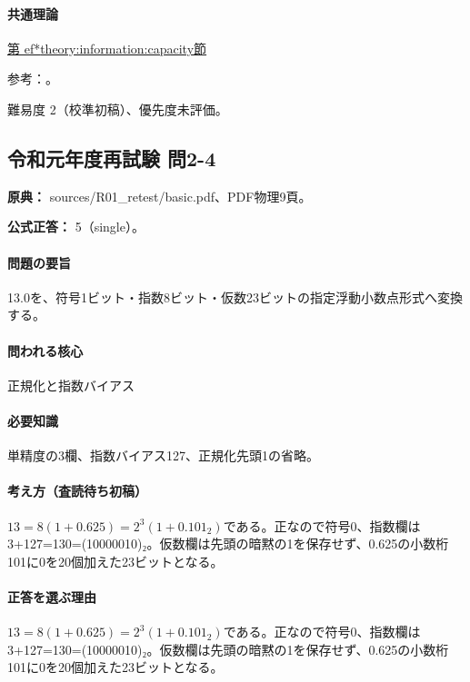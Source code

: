 \paragraph{共通理論} \hyperref[theory:information:capacity]{第
ef*{theory:information:capacity}節}

\par 参考：\cite{nist_binary_prefix}。

\par 難易度 2（校準初稿）、優先度未評価。

\subsection{令和元年度再試験 問2-4}
\label{q:r01-ret-basic-2-4}

\noindent\textbf{原典：} sources/R01\_retest/basic.pdf、PDF物理9頁。

\textbf{公式正答：} 5（single）。

\paragraph{問題の要旨} 13.0を、符号1ビット・指数8ビット・仮数23ビットの指定浮動小数点形式へ変換する。

\paragraph{問われる核心} 正規化と指数バイアス

\paragraph{必要知識} 単精度の3欄、指数バイアス127、正規化先頭1の省略。

\paragraph{考え方（査読待ち初稿）} \(13=8(1+0.625)=2^3(1+0.101_2)\)である。正なので符号0、指数欄は3+127=130=(10000010)₂。仮数欄は先頭の暗黙の1を保存せず、0.625の小数桁101に0を20個加えた23ビットとなる。

\paragraph{正答を選ぶ理由} \(13=8(1+0.625)=2^3(1+0.101_2)\)である。正なので符号0、指数欄は3+127=130=(10000010)₂。仮数欄は先頭の暗黙の1を保存せず、0.625の小数桁101に0を20個加えた23ビットとなる。

